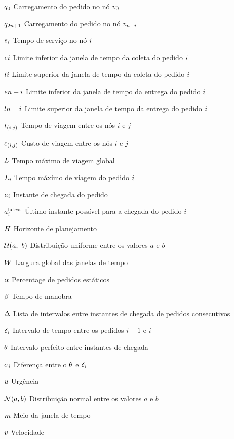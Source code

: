 \begin{simbolos}
    \item[$q_{0}$] Carregamento do pedido no nó $v_{0}$
   \item[$q_{2n + 1}$]
     Carregamento do pedido no nó $v_{n + i}$
    \item[$s_{i}$]
      Tempo de serviço no nó $i$
    \item[$e{i}$]
      Limite inferior da janela de tempo da coleta do pedido $i$
    \item[$l{i}$]
      Limite superior da janela de tempo da coleta do pedido $i$
    \item[$e{n + i}$]
      Limite inferior da janela de tempo da entrega do pedido $i$
    \item[$l{n + i}$]
      Limite superior da janela de tempo da entrega do pedido $i$
    \item[$t_{(i,j)}$] Tempo de viagem entre os nós $i$ e $j$
    \item[$c_{(i,j)}$] Custo de viagem entre os nós $i$ e $j$
    \item[$L$] Tempo máximo de viagem global
    \item[$L_i$] Tempo máximo de viagem do pedido 
      $i$
    \item[$a_i$] Instante de chegada do pedido \request
    \item[$a{}_{i{}}^{\mathrm{latest}}$]
      Último instante possível para a chegada do pedido $i$
    \item[$H$] Horizonte de planejamento
    \item[$\mathcal{U}(a;\ b)$]
      Distribuição uniforme entre os valores $a$ e $b$
    \item[$W$] Largura global das janelas de tempo 
    \item[$\alpha$] Percentage de pedidos estáticos
    \item[$\beta$] Tempo de manobra
    \item[$\Delta$]
      Lista de intervalos entre instantes de chegada de pedidos 
      consecutivos
    \item[$\delta_i$]
      Intervalo de tempo entre os pedidos $i + 1$ e $i$
    \item[$\theta$] Intervalo perfeito entre instantes de chegada
    \item[$\sigma_i$]
      Diferença entre o $\theta$ e 
      $\delta_i$
    \item[$u$] Urgência
    \item[$\mathcal{N}(a,b)$]
       Distribuição normal entre os valores $a$ e $b$
    \item[$m$] Meio da janela de tempo
    \item[$v$] Velocidade
\end{simbolos}
